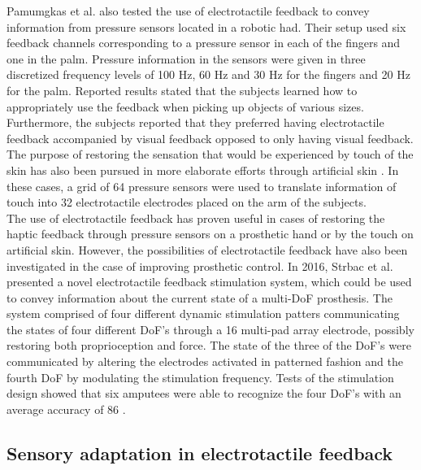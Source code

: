 Pamumgkas et al. \cite{Pamungkas2015} also tested the use of electrotactile feedback to convey information from pressure sensors located in a robotic had. Their setup used six feedback channels corresponding to a pressure sensor in each of the fingers and one in the palm. Pressure information in the sensors were given in three discretized frequency levels of 100 Hz, 60 Hz and 30 Hz for the fingers and 20 Hz for the palm. Reported results stated that the subjects learned how to appropriately use the feedback when picking up objects of various sizes. Furthermore, the subjects reported that they preferred having electrotactile feedback accompanied by visual feedback opposed to only having visual feedback. \cite{Pamungkas2015} 
The purpose of restoring the sensation that would be experienced by touch of the skin has also been pursued in more elaborate efforts through artificial skin \cite{Hartmann2014,Franceschi2015}. In these cases, a grid of 64 pressure sensors were used to translate information of touch into 32 electrotactile electrodes placed on the arm of the subjects. \\
The use of electrotactile feedback has proven useful in cases of restoring the haptic feedback through pressure sensors on a prosthetic hand or by the touch on artificial skin. However, the possibilities of electrotactile feedback have also been investigated in the case of improving prosthetic control. In 2016, Strbac et al. \cite{Strbac2016} presented a novel electrotactile feedback stimulation system, which could be used to convey information about the current state of a multi-DoF prosthesis. The system comprised of four different dynamic stimulation patters communicating the states of four different DoF's through a 16 multi-pad array electrode, possibly restoring both proprioception and force. The state of the three of the DoF's were communicated by altering the electrodes activated in patterned fashion and the fourth DoF by modulating the stimulation frequency. Tests of the stimulation design showed that six amputees were able to recognize the four DoF's with an average accuracy of 86 \percent. \cite{Strbac2016}   

\subsection{Sensory adaptation in electrotactile feedback}

